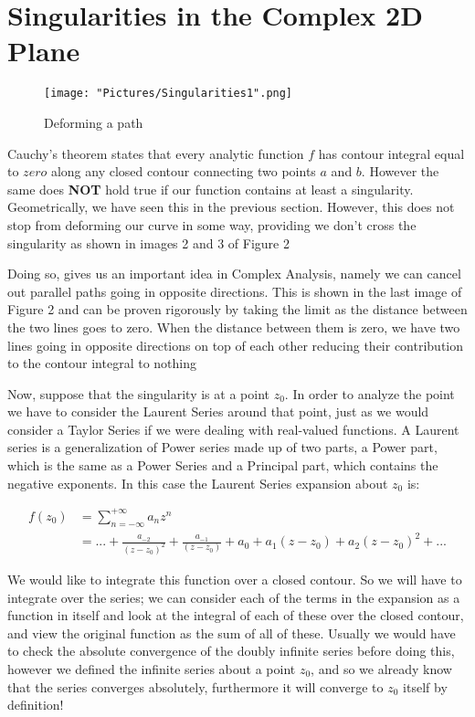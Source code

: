 \documentclass[12pt, letterpaper]{article}
\begin{document}
\section*{Singularities in the Complex 2D Plane}

\begin{figure}[h]
    \centering
    \texttt{[image: "Pictures/Singularities1".png]}
    \caption{Deforming a path}
    \label{fig:my_label2}
\end{figure}

\noindent
Cauchy's theorem  states that every analytic function \(f\) has contour integral equal to \(zero\) along any closed contour connecting two points \(a\) and \(b\). However the same does \textbf{NOT} hold true if our function contains at least a singularity. Geometrically, we have seen this in the previous section. However, this does not stop from deforming our curve in some way, providing we don't cross the singularity as shown in images 2 and 3 of Figure 2
\bigskip

\noindent
Doing so, gives us an important idea in Complex Analysis, namely we can cancel out parallel paths going in opposite directions. This is shown in the last image of Figure 2 and can be proven rigorously by taking the limit as the distance between the two lines goes to zero. When the distance between them is zero, we have two lines going in opposite directions on top of each other reducing their contribution to the contour integral to nothing 
\bigskip

\noindent
Now, suppose that the singularity is at a point \(z_{0}\). In order to analyze the point we have to consider the Laurent Series around that point, just as we would consider a Taylor Series if we were dealing with real-valued functions. A Laurent series is a generalization of Power series made up of two parts, a Power part, which is the same as a Power Series and a Principal part, which contains the negative exponents. In this case the Laurent Series expansion about \(z_{0}\) is:

\begin{align*}
f(z_{0}) &= \sum_{n=-\infty}^{+\infty} a_{n}z^{n}  \\
&= ... + \frac{a_{-2}}{(z-z_{0})^2} + \frac{a_{-1}}{(z-z_{0})} + a_{0} + a_{1}(z-z_{0}) + a_{2}(z-z_{0})^2 + ...
\end{align*}

\noindent
We would like to integrate this function over a closed contour. So we will have to integrate over the series; we can consider each of the terms in the expansion as a function in itself and look at the integral of each of these over the closed contour, and view the original function as the sum of all of these. Usually we would have to check the absolute convergence of the doubly infinite series before doing this, however we defined the infinite series about a point \(z_{0}\), and so we already know that the series converges absolutely, furthermore it will converge to \(z_{0}\) itself by definition!
\bigskip
\end{document}
